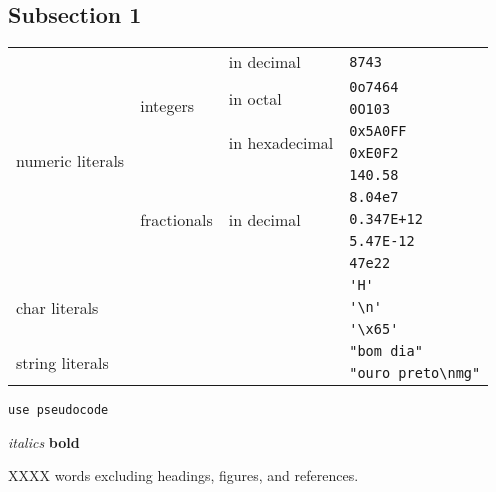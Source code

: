 \documentclass[11pt]{article} %
\begin{document}
\subsection{Subsection 1}


\begin{tabular}{|l|l|l|l|}\hline
  \multirow{10}{*}{numeric literals} 				& \multirow{5}{*}{integers} 	& in decimal 					& \verb|8743| \\ \cline{3-4}
  					    				& 				       	& \multirow{2}{*}{in octal}   		& \verb|0o7464| \\ \cline{4-4}
  					    				& 					& 						& \verb|0O103| \\ \cline{3-4}
  					    				& 					& \multirow{2}{*}{in hexadecimal}	& \verb|0x5A0FF| \\ \cline{4-4}
 				 	    				& 					& 						& \verb|0xE0F2| \\ \cline{2-4}
  					    				& \multirow{5}{*}{fractionals} 	& \multirow{5}{*}{in decimal} 		& \verb|140.58| \\ \cline{4-4}
 				 					& 					& 						& \verb|8.04e7| \\ \cline{4-4}
  									& 					& 						& \verb|0.347E+12| \\ \cline{4-4}
  									& 					& 						& \verb|5.47E-12| \\ \cline{4-4}
  									& 					& 						& \verb|47e22| \\ \cline{1-4}
  \multicolumn{3}{|l|}{\multirow{3}{*}{char literals}} 													& \verb|'H'| \\ \cline{4-4}
  \multicolumn{3}{|l|}{} 																	& \verb|'\n'| \\ \cline{4-4}          %
  \multicolumn{3}{|l|}{} 																	& \verb|'\x65'| \\ \cline{1-4}        %
  \multicolumn{3}{|l|}{\multirow{2}{*}{string literals}} 												& \verb|"bom dia"| \\ \cline{4-4}
  \multicolumn{3}{|l|}{} 																	& \verb|"ouro preto\nmg"| \\ \cline{1-4}          %
\end{tabular}




\begin{verbatim}
use pseudocode
\end{verbatim}

\textit{italics}
\textbf{bold}

XXXX words excluding headings, figures, and references. \\

\nocite{*}

\medskip


\printbibliography
\end{document}
